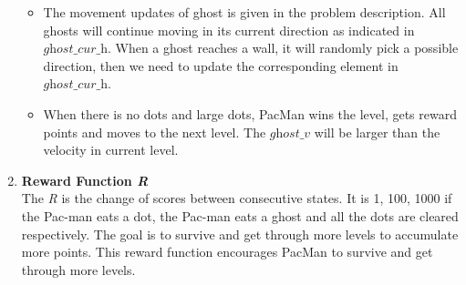 \documentclass{article}
\begin{document}
\begin{enumerate}
\begin{itemize}
\item The movement updates of ghost is given in the problem description. All ghosts will continue moving in its current direction as indicated in $\textit{ghost\_cur\_h}$. When a ghost reaches a wall, it will randomly pick a possible direction, then we need to update the corresponding element in $\textit{ghost\_cur\_h}$. 

\item When there is no dots and large dots, PacMan wins the level, gets reward points and moves to the next level. The $\textit{ghost\_v}$ will be larger than the velocity in current level.
\end{itemize}



\item\textbf{Reward Function \textit{R}}\\
The \textit{R} is the change of scores between consecutive states. It is 1, 100, 1000 if the Pac-man eats a dot, the Pac-man eats a ghost and all the dots are cleared respectively. The goal is to survive and get through more levels to accumulate more points. This reward function encourages PacMan to survive and get through more levels.

\end{enumerate}
 
\end{document}
